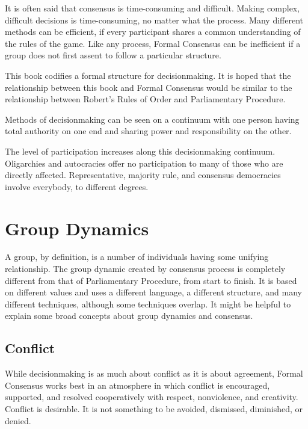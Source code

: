 It is often said that consensus is time-consuming and
difficult. Making complex, difficult decisions is time-consuming,
no matter what the process. Many different methods can be
efficient, if every participant shares a common understanding of
the rules of the game. Like any process, Formal Consensus can be
inefficient if a group does not first assent to follow a
particular structure.

This book codifies a formal structure for decisionmaking. It is
hoped that the relationship between this book and Formal Consensus
would be similar to the relationship between Robert's Rules of
Order and Parliamentary Procedure.

Methods of decisionmaking can be seen on a continuum with one
person having total authority on one end and sharing power
and responsibility on the other.

The level of participation increases along this decisionmaking
continuum. Oligarchies and autocracies offer no participation to
many of those who are directly affected. Representative, majority
rule, and consensus democracies involve everybody, to different
degrees.

\section{Group Dynamics}

A group, by definition, is a number of individuals having some
unifying relationship. The group dynamic created by consensus
process is completely different from that of Parliamentary
Procedure, from start to finish. It is based on different values
and uses a different language, a different structure, and many
different techniques, although some techniques overlap. It
might be helpful to explain some broad concepts about group
dynamics and consensus.

\subsection*{Conflict}

While decisionmaking is as much about conflict as it is about
agreement, Formal Consensus works best in an atmosphere in which
conflict is encouraged, supported, and resolved cooperatively with
respect, nonviolence, and creativity.  Conflict is desirable. It
is not something to be avoided, dismissed, diminished, or denied.

